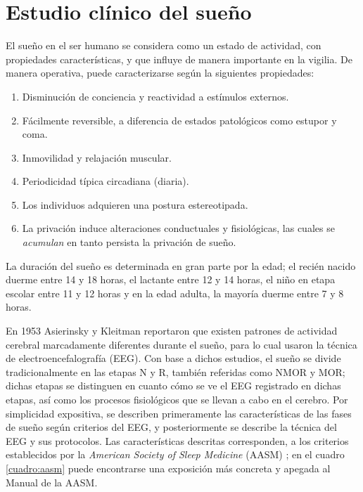 \documentclass[12pt,letterpaper]{book}
\begin{document}

\section{Estudio clínico del sueño}
\label{capitulo:psg}

El sueño en el ser humano se considera como un estado de actividad, con propiedades características, y que influye de manera importante en la vigilia.
%
De manera operativa, puede caracterizarse según la siguientes propiedades:
\begin{enumerate}
\item Disminución de conciencia y reactividad a estímulos externos.
\item Fácilmente reversible, a diferencia de estados patológicos como estupor y coma.
\item Inmovilidad y relajación muscular.
\item Periodicidad típica circadiana (diaria).
\item Los individuos adquieren una postura estereotipada.
\item La privación induce alteraciones conductuales y fisiológicas, las cuales se \textit{acumulan} en tanto persista la privación de sueño.
\end{enumerate}

La duración del sueño es determinada en gran parte por la edad; el recién nacido duerme entre 14 y 
18 horas, el lactante entre 12 y 14 horas, el niño en etapa escolar entre 11 y 12 horas y en la 
edad adulta, la mayoría duerme entre 7 y 8 horas.%

En 1953 Asierinsky y Kleitman reportaron que existen patrones de actividad cerebral marcadamente diferentes durante el sueño, para lo cual usaron la técnica de electroencefalografía (EEG).
%
Con base a dichos estudios, el sueño se divide tradicionalmente en las etapas N y R, también referidas como NMOR y MOR; dichas etapas se distinguen en cuanto cómo se ve el EEG registrado en dichas etapas, así como los procesos fisiológicos que se llevan a cabo en el cerebro.
%
Por simplicidad expositiva, se describen primeramente las características de las fases de sueño según criterios del EEG, y posteriormente se describe la técnica del EEG y sus protocolos. 
%
Las características descritas corresponden, a los criterios establecidos por la \textit{American Society of Sleep Medicine} (AASM) \cite{AASM07}; en el cuadro \ref{cuadro:aasm} puede encontrarse una exposición más concreta y apegada al Manual de la AASM.
\end{document}
